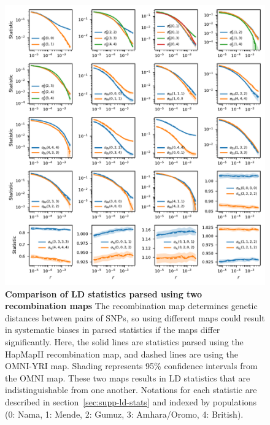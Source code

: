 \documentclass[]{article}
\begin{document}
\clearpage


\begin{figure}[ht]
    \centering
    \includegraphics{figures/supp-omni-hapmap-comparison.pdf}
    \caption{
        \textbf{Comparison of LD statistics parsed using two recombination maps}
        The recombination map determines genetic distances between pairs of SNPs,
        so using different maps could result in systematic biases in parsed
        statistics if the maps differ significantly. Here, the solid lines are
        statistics parsed using the HapMapII recombination map, and dashed lines
        are using the OMNI-YRI map. Shading represents 95\% confidence intervals
        from the OMNI map. These two maps results in LD statistics that are
        indistinguishable from one another. Notations for each statistic are
        described in section~\ref{sec:supp-ld-stats} and indexed by populations
        (0: Nama, 1: Mende, 2: Gumuz, 3: Amhara/Oromo, 4: British).
    }
    \label{fig:supp-omni-hapmap-comparison}
\end{figure}
\end{document}
